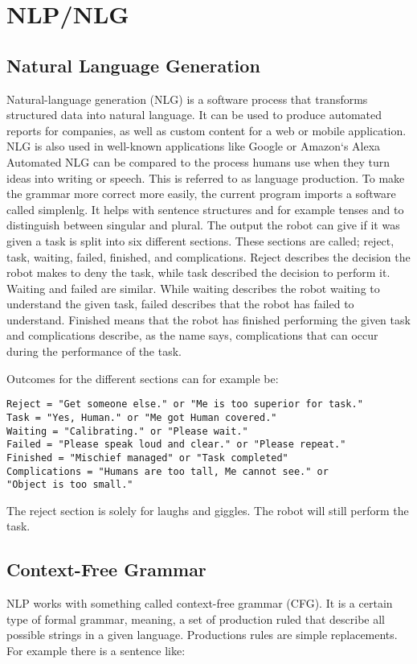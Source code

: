 \documentclass[main.tex]{subfiles}
\begin{document}
	

	\chapter{NLP/NLG}
  
  \section{Natural Language Generation}
  Natural-language generation (NLG) is a software process that transforms structured data into natural language. It can be used to produce automated reports for companies, as well as custom content for a web or mobile application.  NLG is also used in well-known applications like Google or Amazon‘s Alexa
Automated NLG can be compared to the process humans use when they turn ideas into writing or speech. This is referred to as language production.
To make the grammar more correct more easily, the current program imports a software called simplenlg. It helps with sentence structures and for example tenses and to distinguish between singular and plural. 
The output the robot can give if it was given a task is split into six different sections. These sections are called; reject, task, waiting, failed, finished, and complications. Reject describes the decision the robot makes to deny the task, while task described the decision to perform it. Waiting and failed are similar. While waiting describes the robot waiting to understand the given task, failed describes that the robot has failed to understand. Finished means that the robot has finished performing the given task and complications describe, as the name says, complications that can occur during the performance of the task. 
\newpage

Outcomes for the different sections can for example be:
\begin{verbatim}
Reject = "Get someone else." or "Me is too superior for task."
Task = "Yes, Human." or "Me got Human covered." 
Waiting = "Calibrating." or "Please wait."
Failed = "Please speak loud and clear." or "Please repeat."
Finished = "Mischief managed" or "Task completed"
Complications = "Humans are too tall, Me cannot see." or
"Object is too small."
\end{verbatim}

The reject section is solely for laughs and giggles. The robot will still perform the task.
  
  \section{Context-Free Grammar}
  NLP works with something called context-free grammar (CFG). It is a certain type of formal grammar, meaning, a set of  production ruled that describe all possible strings in a given language. Productions rules are simple replacements. For example there is a sentence like:
\end{document}
